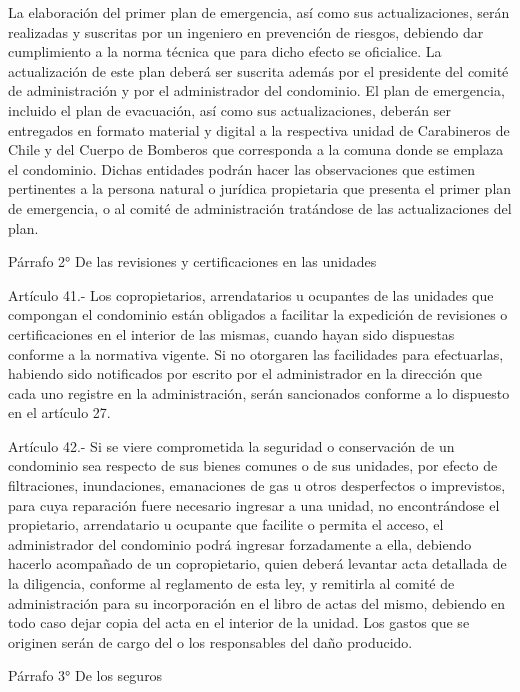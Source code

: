     La elaboración del primer plan de emergencia, así como sus actualizaciones, serán realizadas y suscritas por un ingeniero en prevención de riesgos, debiendo dar cumplimiento a la norma técnica que para dicho efecto se oficialice. La actualización de este plan deberá ser suscrita además por el presidente del comité de administración y por el administrador del condominio.
    El plan de emergencia, incluido el plan de evacuación, así como sus actualizaciones, deberán ser entregados en formato material y digital a la respectiva unidad de Carabineros de Chile y del Cuerpo de Bomberos que corresponda a la comuna donde se emplaza el condominio. Dichas entidades podrán hacer las observaciones que estimen pertinentes a la persona natural o jurídica propietaria que presenta el primer plan de emergencia, o al comité de administración tratándose de las actualizaciones del plan.

     
    Párrafo 2°
    De las revisiones y certificaciones en las unidades

     
    Artículo 41.- Los copropietarios, arrendatarios u ocupantes de las unidades que compongan el condominio están obligados a facilitar la expedición de revisiones o certificaciones en el interior de las mismas, cuando hayan sido dispuestas conforme a la normativa vigente. Si no otorgaren las facilidades para efectuarlas, habiendo sido notificados por escrito por el administrador en la dirección que cada uno registre en la administración, serán sancionados conforme a lo dispuesto en el artículo 27.
     
    Artículo 42.- Si se viere comprometida la seguridad o conservación de un condominio sea respecto de sus bienes comunes o de sus unidades, por efecto de filtraciones, inundaciones, emanaciones de gas u otros desperfectos o imprevistos, para cuya reparación fuere necesario ingresar a una unidad, no encontrándose el propietario, arrendatario u ocupante que facilite o permita el acceso, el administrador del condominio podrá ingresar forzadamente a ella, debiendo hacerlo acompañado de un copropietario, quien deberá levantar acta detallada de la diligencia, conforme al reglamento de esta ley, y remitirla al comité de administración para su incorporación en el libro de actas del mismo, debiendo en todo caso dejar copia del acta en el interior de la unidad. Los gastos que se originen serán de cargo del o los responsables del daño producido.
     
    Párrafo 3°
    De los seguros

